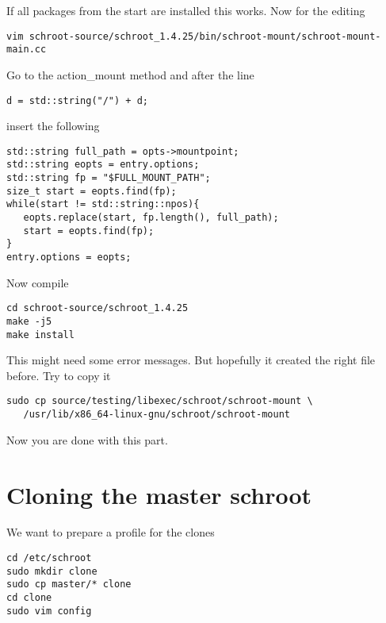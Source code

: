 \documentclass[a4paper]{book}
\begin{document}
If all packages from the start are installed this works.
Now for the editing

\begin{verbatim}
vim schroot-source/schroot_1.4.25/bin/schroot-mount/schroot-mount-main.cc
\end{verbatim}

Go to the action\_mount method and after the line

\begin{verbatim}
d = std::string("/") + d;
\end{verbatim}

insert the following

\begin{verbatim}
std::string full_path = opts->mountpoint;
std::string eopts = entry.options;
std::string fp = "$FULL_MOUNT_PATH";
size_t start = eopts.find(fp);
while(start != std::string::npos){
   eopts.replace(start, fp.length(), full_path);
   start = eopts.find(fp);
}
entry.options = eopts;
\end{verbatim}

Now compile

\begin{verbatim}
cd schroot-source/schroot_1.4.25
make -j5
make install
\end{verbatim}

This might need some error messages. But hopefully it created the right file
before. Try to copy it

\begin{verbatim}
sudo cp source/testing/libexec/schroot/schroot-mount \
   /usr/lib/x86_64-linux-gnu/schroot/schroot-mount 
\end{verbatim}

Now you are done with this part.
\section{Cloning the master schroot}

We want to prepare a profile for the clones

\begin{verbatim}
cd /etc/schroot
sudo mkdir clone
sudo cp master/* clone
cd clone
sudo vim config
\end{verbatim}
\end{document}
